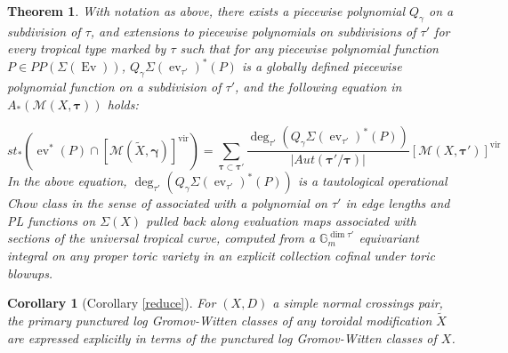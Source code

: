 \documentclass[12pt, oneside]{amsart}   	%
\newcounter{thm}
\newtheorem{theorem}[thm]{Theorem}
\newtheorem{corollary}[thm]{Corollary}
\newcommand{\vir}{\operatorname{vir}}
\newcommand{\ev}{\operatorname{ev}}
\newcommand{\Ev}{\operatorname{Ev}}
\newcommand{\trop}{\operatorname{trop}}
\numberwithin{equation}{section}
\numberwithin{thm}{section}
\numberwithin{figure}{section}
\begin{document}
\begin{theorem}\label{mthm1}
With notation as above, there exists a piecewise polynomial $Q_{\gamma}$ on a subdivision of $\tau$, and extensions to piecewise polynomials on subdivisions of $\tau'$ for every tropical type marked by $\tau$ such that for any piecewise polynomial function $P \in PP(\Sigma(\Ev))$, $Q_{\gamma}\Sigma(\ev_{\tau'})^*(P)$ is a globally defined piecewise polynomial function on a subdivision of $\tau'$, and the following equation in $A_*(\mathscr{M}(X,\pmb\tau))$ holds:

\begin{equation}\label{maineq1}
st_*(\ev^*(P)\cap[\mathscr{M}(\widetilde{X},\pmb\gamma)]^{\vir}) =  \sum_{\pmb\tau \subset \pmb\tau'} \frac{\deg_{\tau'}(Q_{\gamma}\Sigma(\ev_{\tau'})^*(P))}{|Aut(\pmb\tau'/\pmb\tau)|}[\mathscr{M}(X,\pmb\tau')]^{\vir}
\end{equation}
In the above equation, $\deg_{\tau'}(Q_{\gamma}\Sigma(\ev_{\tau'})^*(P))$ is a tautological operational Chow class in the sense of \cite{tauttarget} associated with a polynomial on $\tau'$ in edge lengths and PL functions on $\Sigma(X)$ pulled back along evaluation maps associated with sections of the universal tropical curve, computed from a $\mathbb{G}_m^{\dim \tau'}$ equivariant integral on any proper toric variety in an explicit collection cofinal under toric blowups.

\end{theorem}


\begin{corollary}[Corollary \ref{reduce}]\label{mcr1}
For $(X,D)$ a simple normal crossings pair, the primary punctured log Gromov-Witten classes of any toroidal modification $\widetilde{X}$ are expressed explicitly in terms of the punctured log Gromov-Witten classes of $X$.
\end{corollary}
\end{document}

